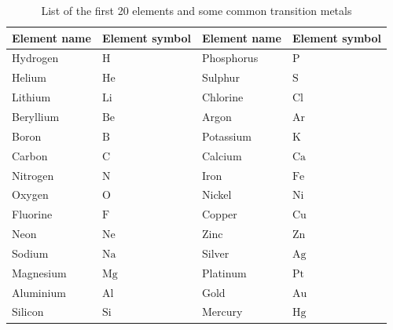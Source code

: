 \begin{table}[h!]
\label{tab:elements}
\begin{center}
\begin{tabular}{|l|l|l|l|}\hline
\textbf{Element name} & \textbf{Element symbol} & \textbf{Element name} & \textbf{Element symbol} \\ \hline
Hydrogen & $\mathrm{H}$ & Phosphorus & $\mathrm{P}$  \\ \hline
Helium & $\mathrm{He}$ & Sulphur & $\mathrm{S}$ \\ \hline
Lithium & $\mathrm{Li}$ & Chlorine & $\mathrm{Cl}$ \\ \hline
Beryllium & $\mathrm{Be}$ & Argon & $\mathrm{Ar}$ \\ \hline 
Boron & $\mathrm{B}$ & Potassium & $\mathrm{K}$ \\ \hline
Carbon & $\mathrm{C}$ & Calcium & $\mathrm{Ca}$ \\ \hline 
Nitrogen & $\mathrm{N}$ & Iron & $\mathrm{Fe}$ \\ \hline
Oxygen & $\mathrm{O}$ & Nickel & $\mathrm{Ni}$ \\ \hline 
Fluorine & $\mathrm{F}$ & Copper & $\mathrm{Cu}$ \\ \hline
Neon & $\mathrm{Ne}$  & Zinc & $\mathrm{Zn}$ \\ \hline
Sodium & $\mathrm{Na}$  & Silver & $\mathrm{Ag}$ \\ \hline
Magnesium & $\mathrm{Mg}$  & Platinum & $\mathrm{Pt}$ \\ \hline
Aluminium & $\mathrm{Al}$ & Gold & $\mathrm{Au}$ \\ \hline
Silicon & $\mathrm{Si}$ & Mercury & $\mathrm{Hg}$  \\ \hline
\end{tabular}
\end{center}
\caption{List of the first 20 elements and some common transition metals}
\end{table}
\par
	\par
      \label{m38708*uid26}
